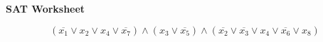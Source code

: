 \documentclass[12pt]{article}
\begin{document}
\newcommand{\I}{\mbox{{\em Int}}}
\newcommand{\lt}{\mbox{{\em left}}}
\newcommand{\rt}{\mbox{{\em right}}}
\newcommand{\ld}{\Delta^l}
\newcommand{\rd}{\Delta^r}
\newcommand{\lsp}[1]{\large\renewcommand{\baselinestretch}{#1}\normalsize}
\newcommand{\hsp}{\hspace{.2in}}

\def\Endwhile{\mbox{\bf endwhile\ }}
\def\Or{\mbox{\bf or\ }}
\def\Do{\mbox{\bf do\ }}
\def\Downto{\mbox{\bf downto\ }}
\def\Int{\mbox{\bf int\ }}
\def\To{\mbox{\bf to\ }}
\def\Repeat{\mbox{\bf repeat\ }}
\def\Until{\mbox{\bf until\ }}
\def\Return{\mbox{\bf return\ }}
\def\Not{\mbox{\bf not\ }}
\def\And{\mbox{\bf and\ }}
\def\For{\mbox{\bf for\ }}
\def\Foreach{\mbox{\bf foreach\ }}
\def\Else{\mbox{\bf else\ }}
\def\Elseif{\mbox{\bf elseif\ }}
\def\End{\mbox{\bf end\ }}
\def\If{\mbox{\bf if\ }}
\def\Mod{\mbox{\bf \ mod\ }}
\def\Then{\mbox{\bf then\ }}
\def\While{\mbox{\bf while\ }}
\def\Output{\mbox{\bf output\ }}


\lsp{1}
\pagestyle{plain}
\begin{center}
{\bf
SAT Worksheet
}
\end{center}

\[\left(\overline{x_1} \vee x_2 \vee x_4 \vee \overline{x_7}\right) \wedge \left(x_3 \vee \overline{x_5}\right) \wedge \left(\overline{x_2} \vee \overline{x_3} \vee x_4 \vee \overline{x_6} \vee x_8 \right) \]

\vspace*{0.05in}
\end{document}
